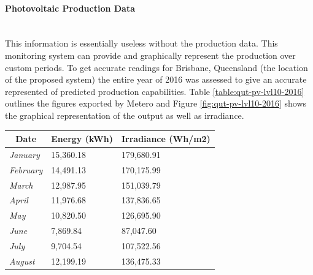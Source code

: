 \paragraph{Photovoltaic Production Data}
~\\
This information is essentially useless without the production data. This monitoring system can provide and graphically represent the production over custom periods. To get accurate readings for Brisbane, Queensland (the location of the proposed system) the entire year of 2016 was assessed to give an accurate represented of predicted production capabilities. Table \ref{table:qut-pv-lvl10-2016} outlines the figures exported by Metero and Figure \ref{fig:qut-pv-lvl10-2016} shows the graphical representation of the output as well as irradiance.  

\begin{table}[H]
	\centering
	\begin{tabular}{|l|l|l|}
		\hline
		\multicolumn{1}{|c|}{\textbf{Date}} & \multicolumn{1}{c|}{\textbf{Energy (kWh)}} & \multicolumn{1}{c|}{\textbf{Irradiance (Wh/m2)}} \\ \hline
		\textit{January}                    & 15,360.18                                  & 179,680.91                                       \\ \hline
		\textit{February}                   & 14,491.13                                  & 170,175.99                                       \\ \hline
		\textit{March}                      & 12,987.95                                  & 151,039.79                                       \\ \hline
		\textit{April}                      & 11,976.68                                  & 137,836.65                                       \\ \hline
		\textit{May}                        & 10,820.50                                  & 126,695.90                                       \\ \hline
		\textit{June}                       & 7,869.84                                   & 87,047.60                                        \\ \hline
		\textit{July}                       & 9,704.54                                   & 107,522.56                                       \\ \hline
		\textit{August}                     & 12,199.19                                  & 136,475.33                                       \\ \hline

\end{tabular}
\end{table}
